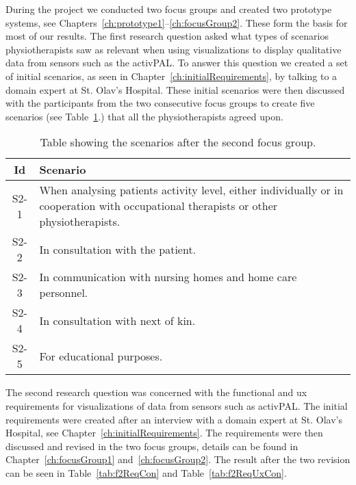During the project we conducted two focus groups and created two prototype systems, see Chapters~\ref{ch:prototype1}--\ref{ch:focusGroup2}. These form the basis for most of our results. The first research question asked what types of scenarios physiotherapists saw as relevant when using visualizations to display qualitative data from sensors such as the activPAL. To answer this question we created a set of initial scenarios, as seen in Chapter~\ref{ch:initialRequirements}, by talking to a domain expert at St. Olav's Hospital. These initial scenarios were then discussed with the participants from the two consecutive focus groups to create five scenarios (see Table~\ref{tab:finalScenarios}.) that all the physiotherapists agreed upon.
\begin{table}[h!]
  \begin{tabular}{|c|p{10cm}|}
    \hline
    \textbf{Id} & \textbf{Scenario} \\ \hline
    S2-1 & When analysing patients activity level, either individually or in cooperation with occupational therapists or other physiotherapists. \\ \hline
    S2-2 & In consultation with the patient. \\ \hline
    S2-3 & In communication with nursing homes and home care personnel. \\ \hline
    S2-4 & In consultation with next of kin. \\ \hline
    S2-5 & For educational purposes. \\ \hline
  \end{tabular}
  \caption[Final scenarios]{Table showing the scenarios after the second focus group.}
  \label{tab:finalScenarios}
\end{table}

The second research question was concerned with the functional and \gls{ux} requirements for visualizations of data from sensors such as activPAL. The initial requirements were created after an interview with a domain expert at St. Olav's Hospital, see Chapter~\ref{ch:initialRequirements}. The requirements were then discussed and revised in the two focus groups, details can be found in Chapter~\ref{ch:focusGroup1} and~\ref{ch:focusGroup2}. The result after the two revision can be seen in Table~\ref{tab:f2ReqCon} and Table~\ref{tab:f2ReqUxCon}.

